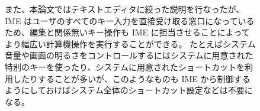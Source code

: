 \documentclass[twoside]{wiss}
\begin{document}
\begin{figure*}[!b]
{\begin{minipage}[b]{0.9\textwidth}
\begin{multicols}{2}
また、本論文ではテキストエディタに絞った説明を行なったが、IME はユーザのすべてのキー入力を直接受け取る窓口になっているため、編集と関係無いキー操作も IME に担当させることによってより幅広い計算機操作を実行することができる。
たとえばシステム音量や画面の明るさをコントロールするにはシステムに用意された特別のキーを使ったり、システムに用意されたショートカットを利用したりすることが多いが、このようなものも IME から制御するようにしておけばシステム全体のショートカット設定などは不要になる。



\end{multicols}
\end{minipage}
}

\newlength{\FUTUREHT}
\setlength{\FUTUREHT}{\the\ht\FUTURE}	%
\hspace*{0.045\textwidth}	%
\box\FUTURE
\vspace*{-\the\FUTUREHT}	%
\vspace*{-10.9mm}		%

\begin{center}
\fboxrule=0pt
\end{center}
\end{figure*}

\end{document}
